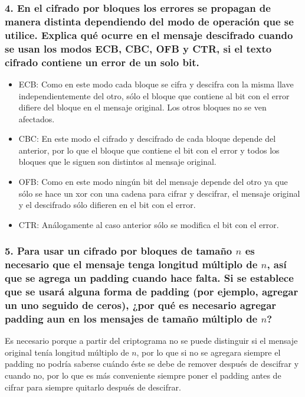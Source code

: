 \documentclass[12pt]{article}
\begin{document}
\subsubsection*{4. En el cifrado por bloques los errores se propagan de manera distinta dependiendo del modo de operación que se utilice. Explica qué ocurre en el mensaje descifrado cuando se usan los modos ECB, CBC, OFB y CTR, si el texto cifrado contiene un error de un solo bit.}
\begin{itemize}
\item ECB: Como en este modo cada bloque se cifra y descifra con la misma llave independientemente del otro, sólo el bloque que contiene al bit con el error difiere del bloque en el mensaje original. Los otros bloques no se ven afectados.
\item CBC: En este modo el cifrado y descifrado de cada bloque depende del anterior, por lo que el bloque que contiene el bit con el error y todos los bloques que le siguen son distintos al mensaje original.
\item OFB: Como en este modo ningún bit del mensaje depende del otro ya que sólo se hace un xor con una cadena para cifrar y descifrar, el mensaje original y el descifrado sólo difieren en el bit con el error.
\item CTR: Análogamente al caso anterior sólo se modifica el bit con el error.
\end{itemize}

\subsubsection*{5. Para usar un cifrado por bloques de tamaño $n$ es necesario que el mensaje tenga longitud múltiplo de $n$, así que se agrega un padding cuando hace falta. Si se establece que se usará alguna forma de padding (por ejemplo, agregar un uno seguido de ceros), ¿por qué es necesario agregar padding aun en los mensajes de tamaño múltiplo de $n$?}
Es necesario porque a partir del criptograma no se puede distinguir si el mensaje original tenía longitud múltiplo de $n$, por lo que si no se agregara siempre el padding no podría saberse cuándo éste se debe de remover después de descifrar y cuando no, por lo que es más conveniente siempre poner el padding antes de cifrar para siempre quitarlo después de descifrar.
\end{document}
